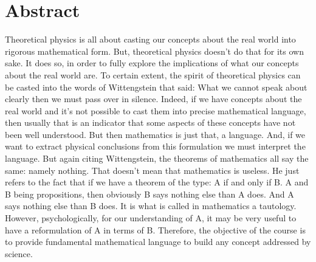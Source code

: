\documentclass[../root.tex]{subfiles}
\begin{document}
\chapter{Abstract}
Theoretical physics is all about casting our concepts about the real world into rigorous mathematical form. But, theoretical physics doesn't do that for its own sake. It does so, in order to fully explore the implications of what our concepts about the real world are. To certain extent, the spirit of theoretical physics can be casted into the words of Wittengstein that said: What we cannot speak about clearly then we must pass over in silence. Indeed, if we have concepts about the real world and it's not possible to cast them into precise mathematical language, then usually that is an indicator that some aspects of these concepts have not been well understood. But then mathematics is just that, a language. And, if we want to extract physical conclusions from this formulation we must interpret the language. But again citing Wittengstein, the theorems of mathematics all say the same: namely nothing. That doesn't mean that mathematics is useless. He just refers to the fact that if we have a theorem of the type: A if and only if B. A and B being propositions, then obviously B says nothing else than A does. And A says nothing else than B does. It is what is called in mathematics a tautology. However, psychologically, for our understanding of A, it may be very useful to have a reformulation of A in terms of B. Therefore, the objective of the course is to provide fundamental mathematical language to build any concept addressed by science.
\end{document}
